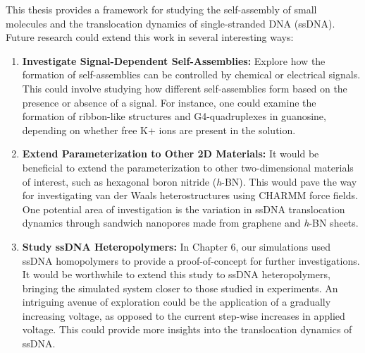 This thesis provides a framework for studying the self-assembly of small molecules and the translocation dynamics of single-stranded DNA (ssDNA). Future research could extend this work in several interesting ways:
\begin{enumerate}
    \item \textbf{Investigate Signal-Dependent Self-Assemblies:} Explore how the formation of self-assemblies can be controlled by chemical or electrical signals. This could involve studying how different self-assemblies form based on the presence or absence of a signal. For instance, one could examine the formation of ribbon-like structures and G4-quadruplexes in guanosine, depending on whether free K+ ions are present in the solution.
    \item \textbf{Extend Parameterization to Other 2D Materials:} It would be beneficial to extend the parameterization to other two-dimensional materials of interest, such as hexagonal boron nitride (\textit{h}-BN). This would pave the way for investigating van der Waals heterostructures using CHARMM force fields. One potential area of investigation is the variation in ssDNA translocation dynamics through sandwich nanopores made from graphene and \textit{h}-BN sheets.
    \item \textbf{Study ssDNA Heteropolymers:} In Chapter 6, our simulations used ssDNA homopolymers to provide a proof-of-concept for further investigations. It would be worthwhile to extend this study to ssDNA heteropolymers, bringing the simulated system closer to those studied in experiments. An intriguing avenue of exploration could be the application of a gradually increasing voltage, as opposed to the current step-wise increases in applied voltage. This could provide more insights into the translocation dynamics of ssDNA.
\end{enumerate}
